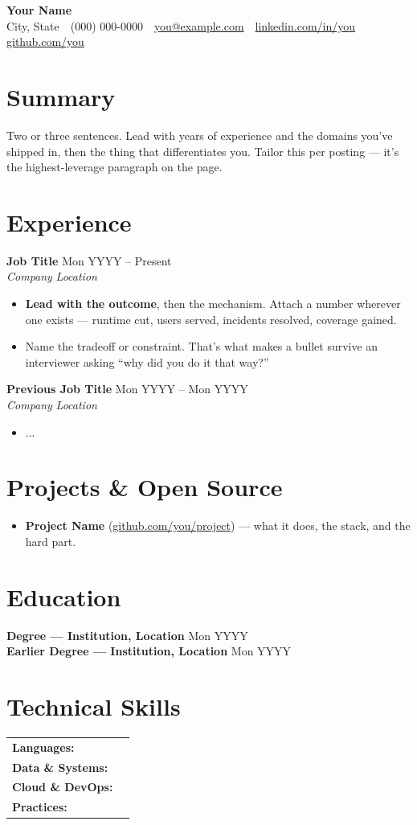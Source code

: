 \documentclass[letterpaper,10pt]{article}
\newcommand{\entry}[4]{\vspace{2pt}%
  \textbf{#1} \hfill {\small #2}\\
  {\small\itshape #3} \hfill {\small\itshape #4}\vspace{0pt}}
\newcommand{\entrytwo}[2]{\vspace{2pt}\textbf{#1} \hfill {\small #2}\vspace{1pt}}
\begin{document}
\begin{center}
  {\LARGE\bfseries\color{accent} Your Name}\\[2pt]
  {\small City, State \,\textbar\, (000) 000-0000 \,\textbar\, \href{mailto:you@example.com}{you@example.com} \,\textbar\, \href{https://linkedin.com/in/you}{linkedin.com/in/you} \,\textbar\, \href{https://github.com/you}{github.com/you}}
\end{center}
\vspace{-8pt}

\section{Summary}
{\small Two or three sentences. Lead with years of experience and the domains
you've shipped in, then the thing that differentiates you. Tailor this per
posting --- it's the highest-leverage paragraph on the page.}

\section{Experience}
\entry{Job Title}{Mon YYYY -- Present}{Company}{Location}
\begin{itemize}\small
  \item \textbf{Lead with the outcome}, then the mechanism. Attach a number wherever one exists --- runtime cut, users served, incidents resolved, coverage gained.
  \item Name the tradeoff or constraint. That's what makes a bullet survive an interviewer asking ``why did you do it that way?''
\end{itemize}

\entry{Previous Job Title}{Mon YYYY -- Mon YYYY}{Company}{Location}
\begin{itemize}\small
  \item ...
\end{itemize}

\section{Projects \& Open Source}
\begin{itemize}\small
  \item \textbf{Project Name} (\href{https://github.com/you/project}{github.com/you/project}) --- what it does, the stack, and the hard part.
\end{itemize}

\section{Education}
\entrytwo{Degree --- Institution, Location}{Mon YYYY}\\[2pt]
\entrytwo{Earlier Degree --- Institution, Location}{Mon YYYY}

\section{Technical Skills}
{\small
\renewcommand{\arraystretch}{0.95}
\begin{tabularx}{\textwidth}{@{}l X@{}}
\textbf{Languages:} & \\
\textbf{Data \& Systems:} & \\
\textbf{Cloud \& DevOps:} & \\
\textbf{Practices:} & \\
\end{tabularx}}
\end{document}
